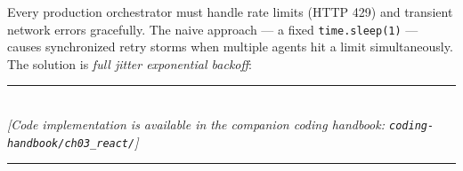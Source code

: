 Every production orchestrator must handle rate limits (HTTP 429) and transient network errors gracefully. The naive approach — a fixed \texttt{time.sleep(1)} — causes synchronized retry storms when multiple agents hit a limit simultaneously. The solution is \textit{full jitter exponential backoff}:


\begin{center}
\noindent\rule{0.6\textwidth}{0.4pt} \\
\vspace{0.3em}
\textit{[Code implementation is available in the companion coding handbook: \texttt{coding-handbook/ch03\_react/}]} \\
\noindent\rule{0.6\textwidth}{0.4pt}
\end{center}

